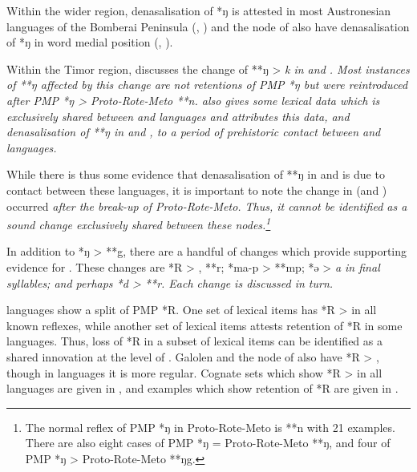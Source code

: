 Within the wider region,
denasalisation of *ŋ is attested in most Austronesian languages
of the Bomberai Peninsula (,
) and the  node of 
also have denasalisation of *ŋ in word medial position (, ).

Within the Timor region,
\citet[67--68]{Edwards2021} discusses the change of **ŋ > \it{k}
in  and .
Most instances of  **ŋ affected by this change
are not retentions of PMP *ŋ but were reintroduced after PMP
*ŋ > Proto-Rote-Meto **n.
\citet[67]{Edwards2021} also gives some lexical data which is
exclusively shared between 
and  languages
and attributes this data,
and denasalisation of **ŋ in 
and , to a period of prehistoric contact between 
and  languages.

While there is thus some evidence that denasalisation of **ŋ
in  and  is due to contact between these languages,
it is important to note the change in  (and ) occurred \it{after} the break-up of Proto-Rote-Meto.
Thus, it cannot be identified as a sound change exclusively shared
between these nodes.\footnote{
		The normal reflex of PMP *ŋ in
		Proto-Rote-Meto is **n with 21 examples.
		There are also eight cases of PMP *ŋ = Proto-Rote-Meto **ŋ,
		and four of PMP *ŋ > Proto-Rote-Meto **ŋg.}

In addition to *ŋ > **g,
there are a handful of changes which provide supporting evidence for .
These changes are *R > {\0},
**r; *ma-p > **mp; *ə > \it{a} in final syllables;
and perhaps *d > **r.
Each change is discussed in turn.

 languages show a split of PMP *R.
One set of lexical items has *R > {\0} in all known  reflexes, while another set of lexical items attests retention of *R in some languages.
Thus, loss of *R in a subset of lexical items can be identified
as a shared innovation at the level of .
Galolen and the  node of 
also have *R > {\0},
though in  languages it is more regular.
Cognate sets which show *R > {\0} in all 
languages are given in ,
and examples which show retention of *R are given in .


